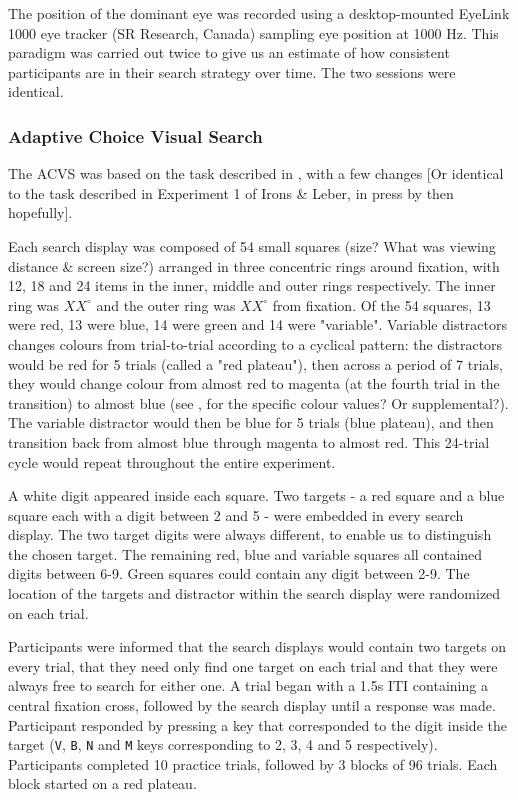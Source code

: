\documentclass[]{rsos}%
\begin{document}
The position of the dominant eye was recorded using a desktop-mounted EyeLink 1000 eye tracker (SR Research, Canada) sampling eye position at 1000 Hz.
This paradigm was carried out twice to give us an estimate of how consistent participants are in their search strategy over time. The two sessions were identical.

\subsubsection{Adaptive Choice Visual Search}

The ACVS was based on the task described in \cite{irons-leber2016}, with a few changes [Or identical to the task described in Experiment 1 of Irons \& Leber, in press by then hopefully].

Each search display was composed of 54 small squares (size? What was viewing distance \& screen size?) arranged in three concentric rings around fixation, with 12, 18 and 24 items in the inner, middle and outer rings respectively. The inner ring was $XX^{\circ}$ and the outer ring was $XX^{\circ}$ from fixation. Of the 54 squares, 13 were red, 13 were blue, 14 were green and 14 were "variable". Variable distractors changes colours from trial-to-trial according to a cyclical pattern: the distractors would be red for 5 trials (called a "red plateau"), then across a period of 7 trials, they would change colour from almost red to magenta (at the fourth trial in the transition) to almost blue (see \cite{irons-leber2017}, for the specific colour values? Or supplemental?). The variable distractor would then be blue for 5 trials (blue plateau), and then transition back from almost blue through magenta to almost red. This 24-trial cycle would repeat throughout the entire experiment. 

A white digit appeared inside each square. Two targets - a red square and a blue square each with a digit between 2 and 5 - were embedded in every search display. The two target digits were always different, to enable us to distinguish the chosen target. The remaining red, blue and variable squares all contained digits between 6-9. Green squares could contain any digit between 2-9. The location of the targets and distractor within the search display were randomized on each trial.

Participants were informed that the search displays would contain two targets on every trial, that they need only find one target on each trial and that they were always free to search for either one. A trial began with a 1.5s ITI containing a central fixation cross, followed by the search display until a response was made. Participant responded by pressing a key that corresponded to the digit inside the target (\texttt{V}, \texttt{B}, \texttt{N} and \texttt{M} keys corresponding to 2, 3, 4 and 5 respectively). Participants completed 10 practice trials, followed by 3 blocks of 96 trials. Each block started on a red plateau.  
\end{document}
